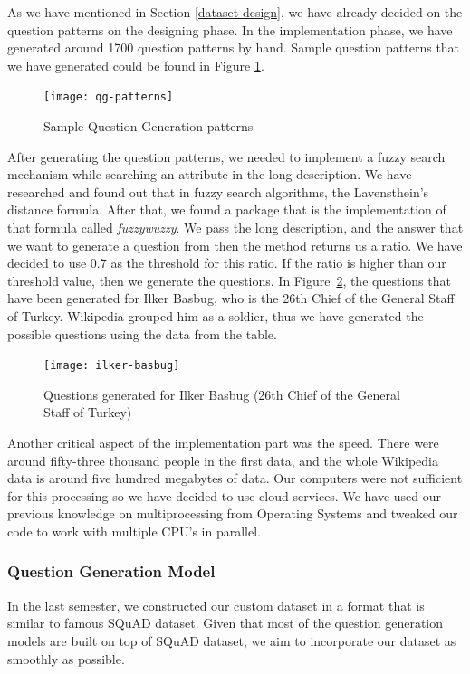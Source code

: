 \documentclass{mefsdp}
\begin{document}
	As we have mentioned in Section \ref{dataset-design}, we have already decided on the question patterns on the designing phase. In the implementation phase, we have generated around 1700 question patterns by hand. Sample question patterns that we have generated could be found in Figure \ref{qg-patterns}.
	\begin{figure}[h!]
		\centering
		\texttt{[image: qg-patterns]}
		\caption{Sample Question Generation patterns\label{qg-patterns}}
	\end{figure}
	After generating the question patterns, we needed to implement a fuzzy search mechanism while searching an attribute in the long description. We have researched and found out that in fuzzy search algorithms, the Lavensthein's distance formula. After that, we found a package that is the implementation of that formula called \textit{fuzzywuzzy}. We pass the long description, and the answer that we want to generate a question from then the method returns us a ratio. We have decided to use 0.7 as the threshold for this ratio. If the ratio is higher than our threshold value, then we generate the questions. In Figure \ref{ilker-basbug}, the questions that have been generated for Ilker Basbug, who is the 26th Chief of the General Staff of Turkey. Wikipedia grouped him as a soldier, thus we have generated the possible questions using the data from the table. \\
	
	\begin{figure}[h!]
		\centering
		\texttt{[image: ilker-basbug]}
		\caption{Questions generated for Ilker Basbug (26th Chief of the General Staff of Turkey)\label{ilker-basbug}}
	\end{figure}
	
	
	Another critical aspect of the implementation part was the speed. There were around fifty-three thousand people in the first data, and the whole Wikipedia data is around five hundred megabytes of data.  Our computers were not sufficient for this processing so we have decided to use cloud services. We have used our previous knowledge on multiprocessing from Operating Systems and tweaked our code to work with multiple CPU's in parallel.
	
	\subsubsection{Question Generation Model}
	In the last semester, we constructed our custom dataset in a format that is similar to famous SQuAD \cite{rajpurkar2016squad} dataset. Given that most of the question generation models are built on top of SQuAD dataset, we aim to incorporate our dataset as smoothly as possible. \newline \par 
	
\end{document}

